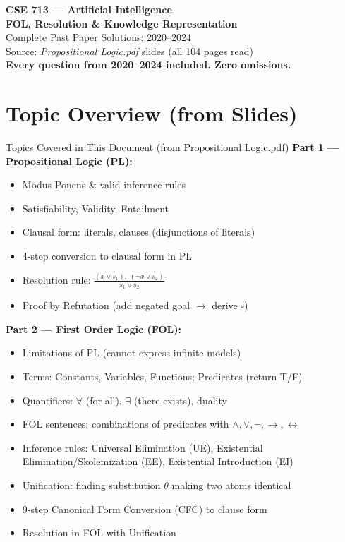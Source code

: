 \documentclass[12pt,a4paper]{article}
\newcommand{\ra}{\rightarrow}
\newcommand{\lra}{\leftrightarrow}
\begin{document}
\begin{center}
{\LARGE\bfseries\color{folblue} CSE 713 --- Artificial Intelligence}\\[4pt]
{\large\bfseries FOL, Resolution \& Knowledge Representation}\\[2pt]
{\large Complete Past Paper Solutions: 2020--2024}\\[6pt]
{\normalsize Source: \textit{Propositional Logic.pdf} slides (all 104 pages read)}\\[2pt]
{\normalsize\color{darkred}\textbf{Every question from 2020--2024 included. Zero omissions.}}
\end{center}

\tableofcontents
\newpage

\section*{Topic Overview (from Slides)}

\begin{keybox}{Topics Covered in This Document (from Propositional Logic.pdf)}
\textbf{Part 1 --- Propositional Logic (PL):}
\begin{itemize}[noitemsep]
  \item Modus Ponens \& valid inference rules
  \item Satisfiability, Validity, Entailment
  \item Clausal form: literals, clauses (disjunctions of literals)
  \item 4-step conversion to clausal form in PL
  \item Resolution rule: $\frac{(x \lor s_1),\;(\neg x \lor s_2)}{s_1 \lor s_2}$
  \item Proof by Refutation (add negated goal $\to$ derive $\square$)
\end{itemize}

\vspace{4pt}\textbf{Part 2 --- First Order Logic (FOL):}
\begin{itemize}[noitemsep]
  \item Limitations of PL (cannot express infinite models)
  \item Terms: Constants, Variables, Functions; Predicates (return T/F)
  \item Quantifiers: $\forall$ (for all), $\exists$ (there exists), duality
  \item FOL sentences: combinations of predicates with $\land,\lor,\neg,\ra,\lra$
  \item Inference rules: Universal Elimination (UE), Existential Elimination/Skolemization (EE), Existential Introduction (EI)
  \item Unification: finding substitution $\theta$ making two atoms identical
  \item 9-step Canonical Form Conversion (CFC) to clause form
  \item Resolution in FOL with Unification
\end{itemize}
\end{keybox}
\end{document}
